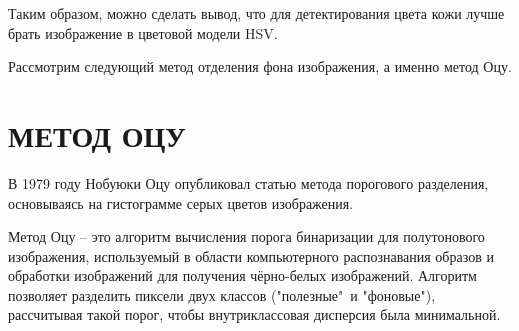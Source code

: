Таким образом, можно сделать вывод, что для детектирования цвета кожи 
лучше брать изображение в цветовой модели HSV. 

Рассмотрим следующий метод отделения фона изображения, а именно метод
Оцу.

\newpage

\section{\centering МЕТОД ОЦУ}

В 1979 году Нобуюки Оцу опубликовал статью \cite{otsu} метода порогового 
разделения, основываясь на гистограмме серых цветов изображения. 

Метод Оцу -- это алгоритм вычисления порога бинаризации для полутонового
изображения, используемый в области компьютерного распознавания образов
и обработки изображений для получения чёрно-белых изображений. Алгоритм
позволяет разделить пиксели двух классов ("полезные"\ и "фоновые"), 
рассчитывая такой порог, чтобы внутриклассовая дисперсия была
минимальной.

